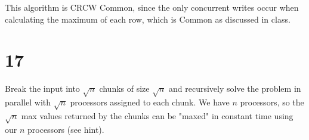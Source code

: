 \documentclass[letterpaper,notitlepage,twoside]{article}
\begin{document}
This algorithm is CRCW Common, since the only concurrent writes occur when calculating the maximum of each row, which is Common as discussed in class.

\section*{17}
Break the input into $\sqrt{n}$ chunks of size $\sqrt{n}$ and recursively solve the problem in parallel with $\sqrt{n}$ processors assigned to each chunk. We have $n$ processors, so the $\sqrt{n}$ max values returned by the chunks can be "maxed" in constant time using our $n$ processors (see hint). 
\end{document}
